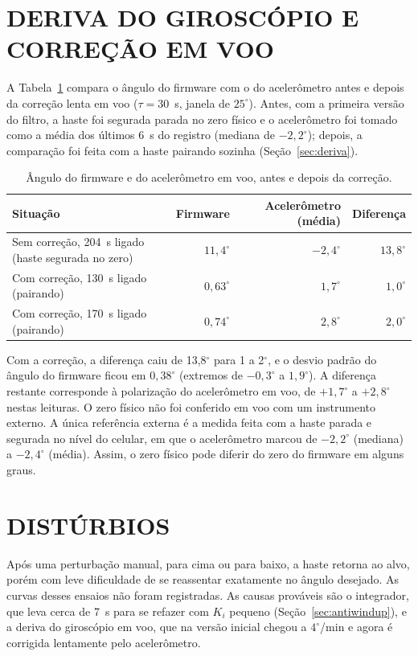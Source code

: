 \section{DERIVA DO GIROSCÓPIO E CORREÇÃO EM VOO}

A Tabela~\ref{tab:deriva} compara o ângulo do firmware com o do acelerômetro antes e depois da correção lenta em voo ($\tau=30$~s, janela de $25^\circ$). Antes, com a primeira versão do filtro, a haste foi segurada parada no zero físico e o acelerômetro foi tomado como a média dos últimos 6~s do registro (mediana de $-2{,}2^\circ$); depois, a comparação foi feita com a haste pairando sozinha (Seção~\ref{sec:deriva}).
\begin{table}[H]
\centering\caption{Ângulo do firmware e do acelerômetro em voo, antes e depois da correção.}\label{tab:deriva}
\begin{tabularx}{\textwidth}{Xrrr}
\hline\textbf{Situação} & \textbf{Firmware} & \textbf{Acelerômetro (média)} & \textbf{Diferença}\\\hline
Sem correção, 204~s ligado (haste segurada no zero) & $11{,}4^\circ$ & $-2{,}4^\circ$ & $13{,}8^\circ$\\
Com correção, 130~s ligado (pairando) & $0{,}63^\circ$ & $1{,}7^\circ$ & $1{,}0^\circ$\\
Com correção, 170~s ligado (pairando) & $0{,}74^\circ$ & $2{,}8^\circ$ & $2{,}0^\circ$\\\hline
\end{tabularx}
\end{table}
Com a correção, a diferença caiu de 13,8$^\circ$ para 1 a 2$^\circ$, e o desvio padrão do ângulo do firmware ficou em $0{,}38^\circ$ (extremos de $-0{,}3^\circ$ a $1{,}9^\circ$). A diferença restante corresponde à polarização do acelerômetro em voo, de $+1{,}7^\circ$ a $+2{,}8^\circ$ nestas leituras. O zero físico não foi conferido em voo com um instrumento externo. A única referência externa é a medida feita com a haste parada e segurada no nível do celular, em que o acelerômetro marcou de $-2{,}2^\circ$ (mediana) a $-2{,}4^\circ$ (média). Assim, o zero físico pode diferir do zero do firmware em alguns graus.

\section{DISTÚRBIOS}

Após uma perturbação manual, para cima ou para baixo, a haste retorna ao alvo, porém com leve dificuldade de se reassentar exatamente no ângulo desejado. As curvas desses ensaios não foram registradas. As causas prováveis são o integrador, que leva cerca de 7~s para se refazer com $K_i$ pequeno (Seção~\ref{sec:antiwindup}), e a deriva do giroscópio em voo, que na versão inicial chegou a $4^\circ$/min e agora é corrigida lentamente pelo acelerômetro.

